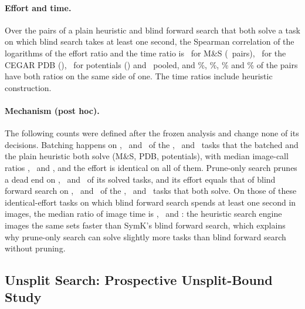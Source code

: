 \documentclass[letterpaper]{article}
\theoremstyle{plain}
\theoremstyle{definition}
\theoremstyle{remark}
\begin{document}
\paragraph{Effort and time.}
Over the pairs of a plain heuristic and blind forward search that both solve
a task on which blind search takes at least one second, the Spearman
correlation of the logarithms of the effort ratio and the time ratio is
\RemEffTimeMsRho\ for M\&S (\RemEffTimeMsPairs\ pairs), \RemEffTimePdbRho\
for the CEGAR PDB (\RemEffTimePdbPairs), \RemEffTimePotRho\ for potentials
(\RemEffTimePotPairs) and \RemEffTimeAllRho\ pooled, and \RemEffTimeMsSame\%,
\RemEffTimePdbSame\%, \RemEffTimePotSame\% and \RemEffTimeAllSame\% of the
pairs have both ratios on the same side of one.  The time ratios include
heuristic construction.

\paragraph{Mechanism (post hoc).}
The following counts were defined after the frozen analysis and change none
of its decisions.  Batching happens on \RemPhMsBatchFired, \RemPhPdbBatchFired\
and \RemPhPotBatchFired\ of the \RemPhMsBatchTasks, \RemPhPdbBatchTasks\ and
\RemPhPotBatchTasks\ tasks that the batched and the plain heuristic both
solve (M\&S, PDB, potentials), with median image-call ratios
\RemPhMsBatchCalls, \RemPhPdbBatchCalls\ and \RemPhPotBatchCalls, and the
effort is identical on all of them.  Prune-only search prunes a dead end on
\RemPhMsPruneDeadEnds, \RemPhPdbPruneDeadEnds\ and \RemPhPotPruneDeadEnds\
of its solved tasks, and its effort equals that of blind forward search on
\RemPhMsPruneSameEffort, \RemPhPdbPruneSameEffort\ and
\RemPhPotPruneSameEffort\ of the \RemPhMsPruneTasks, \RemPhPdbPruneTasks\ and
\RemPhPotPruneTasks\ tasks that both solve.  On those of these
identical-effort tasks on which blind forward search spends at least one
second in images, the median ratio of image time is
\RemPhMsPruneImageTime, \RemPhPdbPruneImageTime\ and
\RemPhPotPruneImageTime: the heuristic search engine images the same sets
faster than SymK's blind forward search, which explains why prune-only search
can solve slightly more tasks than blind forward search without pruning.

\subsection{Unsplit Search: Prospective Unsplit-Bound Study}
\label{sec:supp-unsplit}
\end{document}

